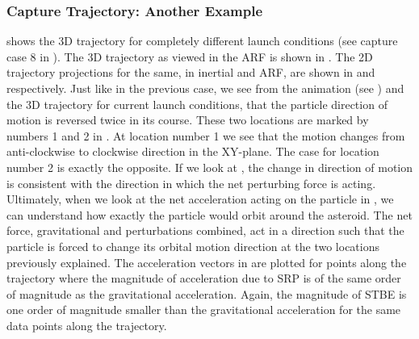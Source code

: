\subsubsection{Capture Trajectory: Another Example}
 shows the 3D trajectory for completely different launch conditions (see capture case 8 in ). The 3D trajectory as viewed in the \gls{ARF} is shown in . The 2D trajectory projections for the same, in inertial and \gls{ARF}, are shown in  and  respectively. Just like in the previous case, we see from the animation (see ) and the 3D trajectory for current launch conditions, that the particle direction of motion is reversed twice in its course. These two locations are marked by numbers 1 and 2 in . At location number 1 we see that the motion changes from anti-clockwise to clockwise direction in the XY-plane. The case for location number 2 is exactly the opposite. If we look at , the change in direction of motion is consistent with the direction in which the net perturbing force is acting. Ultimately, when we look at the net acceleration acting on the particle in , we can understand how exactly the particle would orbit around the asteroid. The net force, gravitational and perturbations combined, act in a direction such that the particle is forced to change its orbital motion direction at the two locations previously explained. The acceleration vectors in  are plotted for points along the trajectory where the magnitude of acceleration due to \gls{SRP} is of the same order of magnitude as the gravitational acceleration. Again, the magnitude of \gls{STBE} is one order of magnitude smaller than the gravitational acceleration for the same data points along the trajectory.
